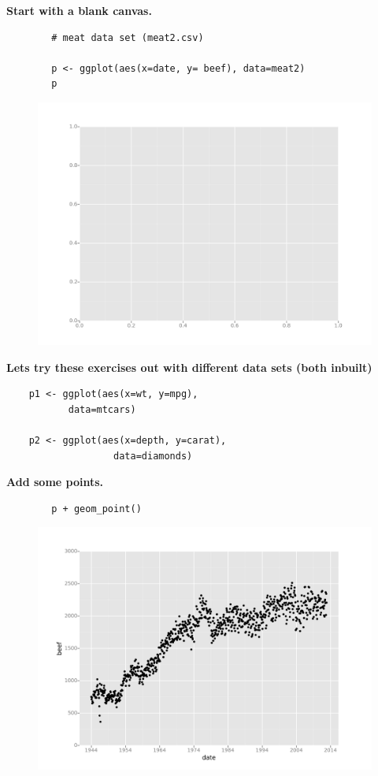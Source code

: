 \documentclass{beamer}
\begin{document}
\begin{frame}[fragile]
	\textbf{	Start with a blank canvas.}
	\begin{framed}
		\begin{verbatim}
		# meat data set (meat2.csv)
		
		p <- ggplot(aes(x=date, y= beef), data=meat2)
		p
		\end{verbatim}
	\end{framed}
	\begin{figure}
		\centering
		\includegraphics[width=0.5\linewidth]{Layers1}
	\end{figure}
	
\end{frame}
\begin{frame}[fragile]
	\vspace{-0.7cm}
\textbf{Lets try these exercises out with different data sets (both inbuilt)}
	\begin{framed}
		\begin{verbatim}
	p1 <- ggplot(aes(x=wt, y=mpg), 
	       data=mtcars)
	       
	p2 <- ggplot(aes(x=depth, y=carat), 
	               data=diamonds)
		\end{verbatim}
	\end{framed}

	
\end{frame}
\begin{frame}[fragile]
\textbf{	Add some points.}
	\begin{framed}
		\begin{verbatim}
		p + geom_point()

		\end{verbatim}
	\end{framed}
	\begin{figure}
		\centering
		\includegraphics[width=0.7\linewidth]{Layers2}
	\end{figure}
	
	
\end{frame}
\end{document}
